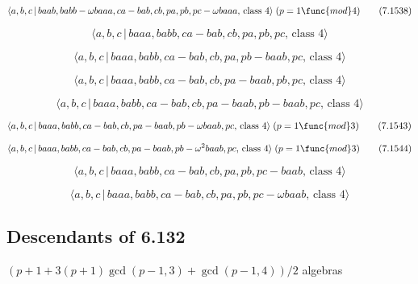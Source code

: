 \documentclass[10pt]{article}
\begin{document}
\begin{equation}
\langle a,b,c\,|\,baab,babb-\omega baaa,ca-bab,cb,pa,pb,pc-\omega baaa,\,%
\text{class }4\rangle \;(p=1\func{mod}4)  \tag{7.1538}
\end{equation}

\begin{equation}
\langle a,b,c\,|\,baaa,babb,ca-bab,cb,pa,pb,pc,\,\text{class }4\rangle 
\tag{7.1539}
\end{equation}

\begin{equation}
\langle a,b,c\,|\,baaa,babb,ca-bab,cb,pa,pb-baab,pc,\,\text{class }4\rangle 
\tag{7.1540}
\end{equation}

\begin{equation}
\langle a,b,c\,|\,baaa,babb,ca-bab,cb,pa-baab,pb,pc,\,\text{class }4\rangle 
\tag{7.1541}
\end{equation}

\begin{equation}
\langle a,b,c\,|\,baaa,babb,ca-bab,cb,pa-baab,pb-baab,pc,\,\text{class }%
4\rangle  \tag{7.1542}
\end{equation}

\begin{equation}
\langle a,b,c\,|\,baaa,babb,ca-bab,cb,pa-baab,pb-\omega baab,pc,\,\text{%
class }4\rangle \;(p=1\func{mod}3)  \tag{7.1543}
\end{equation}

\begin{equation}
\langle a,b,c\,|\,baaa,babb,ca-bab,cb,pa-baab,pb-\omega ^{2}baab,pc,\,\text{%
class }4\rangle \;(p=1\func{mod}3)  \tag{7.1544}
\end{equation}

\begin{equation}
\langle a,b,c\,|\,baaa,babb,ca-bab,cb,pa,pb,pc-baab,\,\text{class }4\rangle 
\tag{7.1545}
\end{equation}

\begin{equation}
\langle a,b,c\,|\,baaa,babb,ca-bab,cb,pa,pb,pc-\omega baab,\,\text{class }%
4\rangle  \tag{7.1546}
\end{equation}

\subsection{Descendants of 6.132}

$(p+1+3(p+1)\gcd (p-1,3)+\gcd (p-1,4))/2$ algebras
\end{document}
